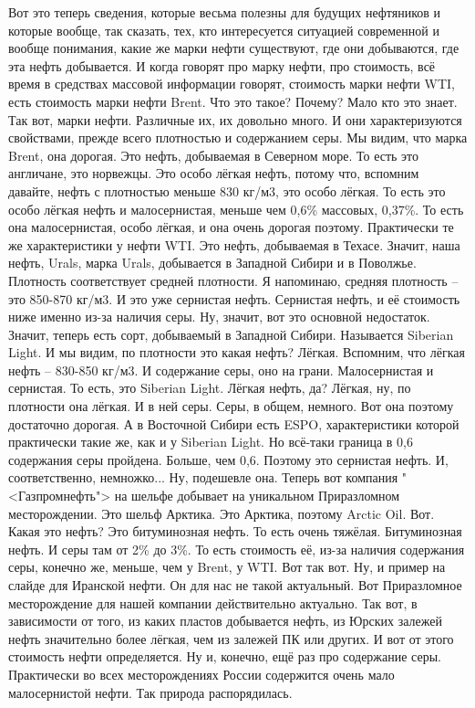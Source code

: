 \documentclass[main.tex]{subfiles}
\begin{document}
Вот это теперь сведения, которые весьма полезны для будущих нефтяников и которые вообще, так сказать, тех, кто интересуется ситуацией современной
и вообще понимания, какие же марки нефти существуют, где они добываются, где эта нефть добывается.
И когда говорят про марку нефти, про стоимость, всё время в средствах массовой информации говорят, стоимость марки нефти WTI, есть стоимость марки нефти Brent.
Что это такое? Почему?
Мало кто это знает.
Так вот, марки нефти.
Различные их, их довольно много.
И они характеризуются свойствами, прежде всего плотностью и содержанием серы.
Мы видим, что марка Brent, она дорогая.
Это нефть, добываемая в Северном море.
То есть это англичане, это норвежцы.
Это особо лёгкая нефть, потому что, вспомним давайте, нефть с плотностью меньше 830 кг/м3, это особо лёгкая.
То есть это особо лёгкая нефть и малосернистая, меньше чем 0,6\% массовых, 0,37\%.
То есть она малосернистая, особо лёгкая, и она очень дорогая поэтому.
Практически те же характеристики у нефти WTI.
Это нефть, добываемая в Техасе.
Значит, наша нефть, Urals, марка Urals, добывается в Западной Сибири и в Поволжье.
Плотность соответствует средней плотности.
Я напоминаю, средняя плотность -- это 850-870 кг/м3.
И это уже сернистая нефть.
Сернистая нефть, и её стоимость ниже именно из-за наличия серы.
Ну, значит, вот это основной недостаток.
Значит, теперь есть сорт, добываемый в Западной Сибири.
Называется Siberian Light.
И мы видим, по плотности это какая нефть?
Лёгкая.
Вспомним, что лёгкая нефть -- 830-850 кг/м3.
И содержание серы, оно на грани.
Малосернистая и сернистая.
То есть, это Siberian Light.
Лёгкая нефть, да?
Лёгкая, ну, по плотности она лёгкая.
И в ней серы.
Серы, в общем, немного.
Вот она поэтому достаточно дорогая.
А в Восточной Сибири есть ESPO, характеристики которой практически такие же, как и у Siberian Light.
Но всё-таки граница в 0,6 содержания серы пройдена.
Больше, чем 0,6.
Поэтому это сернистая нефть.
И, соответственно, немножко...
Ну, подешевле она.
Теперь вот компания "<Газпромнефть"> на шельфе добывает на уникальном Приразломном месторождении.
Это шельф Арктика.
Это Арктика, поэтому Arctic Oil.
Вот. Какая это нефть?
Это битуминозная нефть.
То есть очень тяжёлая.
Битуминозная нефть.
И серы там от 2\% до 3\%.
То есть стоимость её, из-за наличия содержания серы, конечно же, меньше, чем у Brent, у WTI.
Вот так вот.
Ну, и пример на слайде для Иранской нефти.
Он для нас не такой актуальный.
Вот Приразломное месторождение для нашей компании действительно актуально.
Так вот, в зависимости от того, из каких пластов добывается нефть, из Юрских залежей нефть значительно более лёгкая, чем из залежей ПК или других.
И вот от этого стоимость нефти определяется.
Ну и, конечно, ещё раз про содержание серы.
Практически во всех месторождениях России содержится очень мало малосернистой нефти.
Так природа распорядилась.
\end{document}
